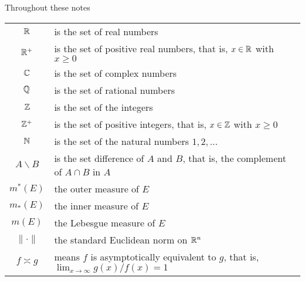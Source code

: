 Throughout these notes

\begin{tabular}{cl}
  $\mathbb{R}$ & is the set of real numbers\\
  $\mathbb{R}^+$ & is the set of positive real numbers, that is, $x\in\mathbb{R}$ with
             $x\geq 0$\\
  $\mathbb{C}$ & is the set of complex numbers\\
  $\mathbb{Q}$ & is the set of rational numbers\\
  $\mathbb{Z}$ & is the set of the integers\\
  $\mathbb{Z}^+$ & is the set of positive integers, that is, $x\in\mathbb{Z}$ with
             $x\geq 0$\\
  $\mathbb{N}$ & is the set of the natural numbers $1,2,\ldots$\\
  $A\smallsetminus B$ & is the set difference of $A$ and $B$, that is, the
                        complement of $A\cap B$ in $A$\\
  $m^*(E)$ & the outer measure of $E$\\
  $m_*(E)$ & the inner measure of $E$\\
  $m(E)$ & the Lebesgue measure of $E$\\
  $\|\cdot\|$ & the standard Euclidean norm on $\mathbb{R}^n$\\
  $f\asymp g$ & means $f$ is asymptotically equivalent to $g$, that is,
                $\lim_{x\to\infty} g(x)/f(x)=1$\\
\end{tabular}

\newpage


